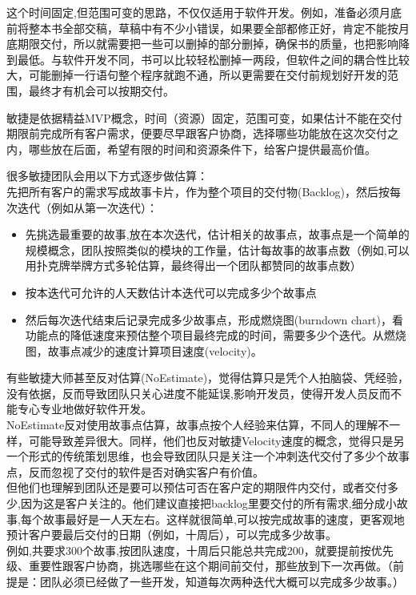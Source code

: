 这个时间固定,但范围可变的思路，不仅仅适用于软件开发。例如，准备必须月底前将整本书全部交稿，草稿中有不少小错误，如果要全部都修正好，肯定不能按月底期限交付，所以就需要把一些可以删掉的部分删掉，确保书的质量，也把影响降到最低。与软件开发不同，书可以比较轻松删掉一两段，但软件之间的耦合性比较大，可能删掉一行语句整个程序就跑不通，所以更需要在交付前规划好开发的范围，最终才有机会可以按期交付。

敏捷是依据精益MVP概念，时间（资源）固定，范围可变，如果估计不能在交付期限前完成所有客户需求，便要尽早跟客户协商，选择哪些功能放在这次交付之内，哪些放在后面，希望有限的时间和资源条件下，给客户提供最高价值。

很多敏捷团队会用以下方式逐步做估算：\\
先把所有客户的需求写成故事卡片，作为整个项目的交付物(Backlog)，然后按每次迭代（例如从第一次迭代）：

\begin{itemize}
\tightlist
\item
  先挑选最重要的故事,放在本次迭代，估计相关的故事点，故事点是一个简单的规模概念，团队按照类似的模块的工作量，估计每故事的故事点数（例如,可以用扑克牌举牌方式多轮估算，最终得出一个团队都赞同的故事点数）
\item
  按本迭代可允许的人天数估计本迭代可以完成多少个故事点
\item
  然后每次迭代结束后记录完成多少故事点，形成燃烧图(burndown
  chart)，看功能点的降低速度来预估整个项目最终完成的时间，需要多少个迭代。从燃烧图，故事点减少的速度计算项目速度(velocity)。
\end{itemize}

\begin{description}
\item[]
\begin{description}
\tightlist
\item[]
+ + +
\end{description}
\end{description}

有些敏捷大师甚至反对估算(NoEstimate)，觉得估算只是凭个人拍脑袋、凭经验，没有依据，反而导致团队只关心进度不能延误,影响开发员，使得开发人员反而不能专心专业地做好软件开发。\\
NoEstimate反对使用故事点估算，故事点按个人经验来估算，不同人的理解不一样，可能导致差异很大。同样，他们也反对敏捷Velocity速度的概念，觉得只是另一个形式的传统策划思维，也会导致团队只是关注一个冲刺迭代交付了多少个故事点，反而忽视了交付的软件是否对确实客户有价值。\\
但他们也理解到团队还是要可以预估可否在客户定的期限件内交付，或者交付多少,因为这是客户关注的。他们建议直接把backlog里要交付的所有需求,细分成小故事,每个故事最好是一人天左右。这样就很简单,可以按完成故事的速度，更客观地预计客户要最后交付的日期（例如，十周后），可以完成多少故事。\\
例如,共要求300个故事,按团队速度，十周后只能总共完成200，就要提前按优先级、重要性跟客户协商，挑选哪些在这个期间前交付，那些放到下一次再做。（前提是：团队必须已经做了一些开发，知道每次两种迭代大概可以完成多少故事。）

